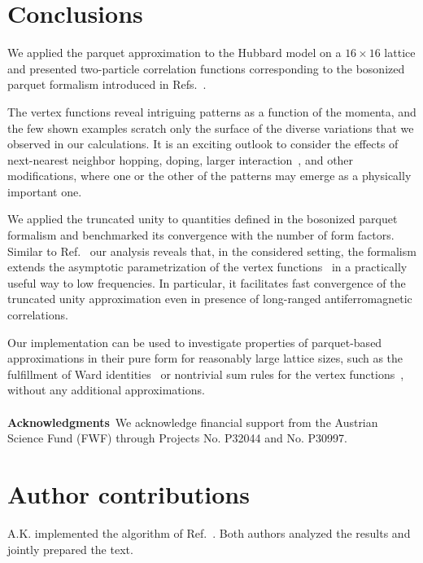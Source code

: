 \documentclass[epj]{svjour}
\begin{document}
\section{Conclusions}\label{sec:conclusions}
{We applied the parquet approximation to the Hubbard model on a $16\times16$ lattice}
and presented two-particle correlation functions corresponding to the bosonized parquet formalism introduced in Refs.~\cite{Krien20,Krien21-2}.

The vertex functions reveal intriguing patterns as a function of the momenta,
and the few shown examples scratch only
the surface of the diverse variations that we observed in our calculations.
It is an exciting outlook to consider the effects of next-nearest neighbor hopping,
doping, larger interaction~\cite{Krien20,Chalupa21}, and other modifications,
where one or the other of the patterns may emerge as a physically important one.

We applied the truncated unity to quantities defined in the bosonized parquet formalism
and benchmarked its convergence with the number of form factors.
Similar to Ref.~\cite{Harkov21} our analysis reveals that, in the considered setting,
the formalism extends the asymptotic parametrization of the vertex functions~\cite{Wentzell20}
in a practically useful way to low frequencies.
{In particular, it facilitates fast convergence of the truncated unity approximation
even in presence of long-ranged antiferromagnetic correlations.}

Our implementation can be used to investigate properties of parquet-based approximations in their pure form
for reasonably large lattice sizes, such as the fulfillment of Ward identities~\cite{Janis17,Chalupa21-2}
or nontrivial sum rules for the vertex functions~\cite{Mermin67},
without any additional approximations.
\\
\\
\noindent
\textbf{Acknowledgments}\
We acknowledge financial support from the Austrian Science Fund (FWF) through Projects No. P32044 and No. P30997.

\section*{Author contributions}
A.K. implemented the algorithm of Ref.~\cite{Krien21-2}. Both authors analyzed the results and jointly prepared the text.



\end{document}
